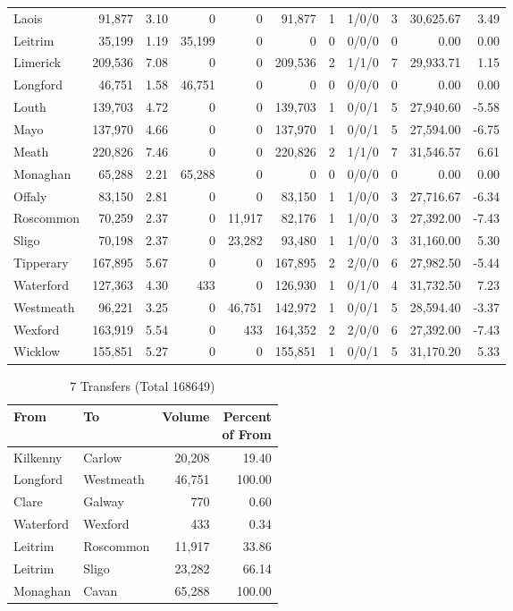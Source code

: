 \documentclass[a4paper]{article}
\begin{document}
\begin{longtable}{lrrrrrrlrrr}
Laois&91,877& 3.10&0&0&91,877&1&1/0/0&3&30,625.67& 3.49\\ 
Leitrim&35,199& 1.19&35,199&0&0&0&0/0/0&0& 0.00& 0.00\\ 
Limerick&209,536& 7.08&0&0&209,536&2&1/1/0&7&29,933.71& 1.15\\ 
Longford&46,751& 1.58&46,751&0&0&0&0/0/0&0& 0.00& 0.00\\ 
Louth&139,703& 4.72&0&0&139,703&1&0/0/1&5&27,940.60&-5.58\\ 
Mayo&137,970& 4.66&0&0&137,970&1&0/0/1&5&27,594.00&-6.75\\ 
Meath&220,826& 7.46&0&0&220,826&2&1/1/0&7&31,546.57& 6.61\\ 
Monaghan&65,288& 2.21&65,288&0&0&0&0/0/0&0& 0.00& 0.00\\ 
Offaly&83,150& 2.81&0&0&83,150&1&1/0/0&3&27,716.67&-6.34\\ 
Roscommon&70,259& 2.37&0&11,917&82,176&1&1/0/0&3&27,392.00&-7.43\\ 
Sligo&70,198& 2.37&0&23,282&93,480&1&1/0/0&3&31,160.00& 5.30\\ 
Tipperary&167,895& 5.67&0&0&167,895&2&2/0/0&6&27,982.50&-5.44\\ 
Waterford&127,363& 4.30&433&0&126,930&1&0/1/0&4&31,732.50& 7.23\\ 
Westmeath&96,221& 3.25&0&46,751&142,972&1&0/0/1&5&28,594.40&-3.37\\ 
Wexford&163,919& 5.54&0&433&164,352&2&2/0/0&6&27,392.00&-7.43\\ 
Wicklow&155,851& 5.27&0&0&155,851&1&0/0/1&5&31,170.20& 5.33\\ 
\end{longtable}

\begin{table}[htbp]
\caption{7 Transfers (Total 168649)}
\centering
\begin{tabular}{llrr} \toprule
From &To &Volume &\shortstack{Percent\\of From} \\ \midrule
Kilkenny&Carlow&20,208&19.40\\ 
Longford&Westmeath&46,751&100.00\\ 
Clare&Galway&770& 0.60\\ 
Waterford&Wexford&433& 0.34\\ 
Leitrim&Roscommon&11,917&33.86\\ 
Leitrim&Sligo&23,282&66.14\\ 
Monaghan&Cavan&65,288&100.00\\ 
\bottomrule
\end{tabular}
\end{table}
\end{document}
